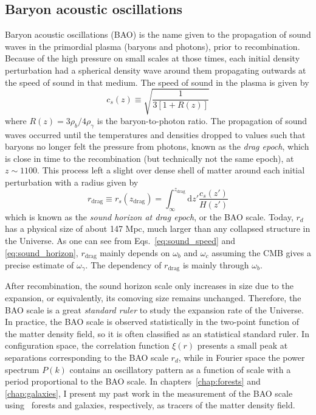    
    \subsection{Baryon acoustic oscillations}
    \label{intro:probes:bao}

    Baryon acoustic oscillations (BAO) is the name given to the propagation of sound
    waves in the primordial plasma (baryons and photons), prior to recombination. 
    Because of the high pressure on small scales at those times, 
    each initial density perturbation had a spherical density wave around them 
    propagating outwards at the speed of sound in that medium. The speed of sound
    in the plasma is given by 
    \begin{equation}
        c_s(z) \equiv \sqrt{\frac{1}{3[1+R(z)]}}
        \label{eq:sound_speed}
    \end{equation}
    where $R(z) = 3\rho_b / 4 \rho_\gamma$ is the baryon-to-photon ratio.
    The propagation of sound waves occurred until the temperatures and densities 
    dropped to values such that baryons no longer 
    felt the pressure from photons, known as the \emph{drag epoch}, which is 
    close in time to the recombination (but technically not the same epoch), at $z\sim 1100$. 
    This process left a slight over dense shell of matter around each initial perturbation
    with a radius given by 
    \begin{equation}
        r_\mathrm{drag} \equiv r_s(z_\mathrm{drag}) = 
            \int_\infty^{z_\mathrm{drag}} \mathrm{d}z' \frac{c_s(z')}{H(z')}
        \label{eq:sound_horizon}
    \end{equation}
    which is known as the \emph{sound horizon at drag epoch}, or the BAO scale. 
    Today, $r_d$ has a physical size of about 147 Mpc, much larger than any 
    collapsed structure in the Universe. 
    As one can see from Eqs.~\ref{eq:sound_speed}
    and \ref{eq:sound_horizon}, $r_\mathrm{drag}$ mainly depends on 
    $\omega_b$ and $\omega_c$ assuming the CMB gives a precise 
    estimate of $\omega_\gamma$. The dependency of $r_\mathrm{drag}$ 
    is mainly through $\omega_b$.

    After recombination, the sound horizon scale only increases in size 
    due to the expansion, or equivalently, its comoving size remains unchanged. 
    Therefore, the BAO scale is a great \emph{standard ruler} to study the expansion 
    rate of the Universe. 
    In practice, the BAO scale is observed statistically in the 
    two-point function of the matter density field, so it is often 
    classified as an statistical standard ruler. 
    In configuration space, the correlation function $\xi(r)$ presents a small 
    peak at separations corresponding to the BAO scale $r_d$, while in Fourier space 
    the power spectrum $P(k)$ contains an oscillatory pattern as a function of scale 
    with a period proportional to the BAO scale.  
    In chapters~\ref{chap:forests} and \ref{chap:galaxies}, I present 
    my past work in the measurement of the BAO scale using \lya\ forests 
    and galaxies, respectively, as tracers of the matter density field.
    
